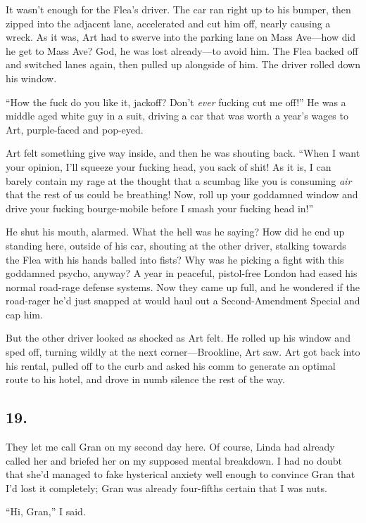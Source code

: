 It wasn’t enough for the Flea’s driver. The car ran right up to his
bumper, then zipped into the adjacent lane, accelerated and cut him
off, nearly causing a wreck. As it was, Art had to swerve into the
parking lane on Mass Ave—how did he get to Mass Ave? God, he was
lost already—to avoid him. The Flea backed off and switched lanes
again, then pulled up alongside of him. The driver rolled down his
window.

“How the fuck do you like it, jackoff? Don’t \emph{ever} fucking
cut me off!” He was a middle aged white guy in a suit, driving a
car that was worth a year’s wages to Art, purple-faced and
pop-eyed.

Art felt something give way inside, and then he was shouting back.
“When I want your opinion, I’ll squeeze your fucking head, you sack
of shit! As it is, I can barely contain my rage at the thought that
a scumbag like you is consuming \emph{air} that the rest of us
could be breathing! Now, roll up your goddamned window and drive
your fucking bourge-mobile before I smash your fucking head in!”

He shut his mouth, alarmed. What the hell was he saying? How did he
end up standing here, outside of his car, shouting at the other
driver, stalking towards the Flea with his hands balled into fists?
Why was he picking a fight with this goddamned psycho, anyway? A
year in peaceful, pistol-free London had eased his normal road-rage
defense systems. Now they came up full, and he wondered if the
road-rager he’d just snapped at would haul out a Second-Amendment
Special and cap him.

But the other driver looked as shocked as Art felt. He rolled up
his window and sped off, turning wildly at the next
corner—Brookline, Art saw. Art got back into his rental, pulled off
to the curb and asked his comm to generate an optimal route to his
hotel, and drove in numb silence the rest of the way.

\subsection{19.}

They let me call Gran on my second day here. Of course, Linda had
already called her and briefed her on my supposed mental breakdown.
I had no doubt that she’d managed to fake hysterical anxiety well
enough to convince Gran that I’d lost it completely; Gran was
already four-fifths certain that I was nuts.

“Hi, Gran,” I said.

